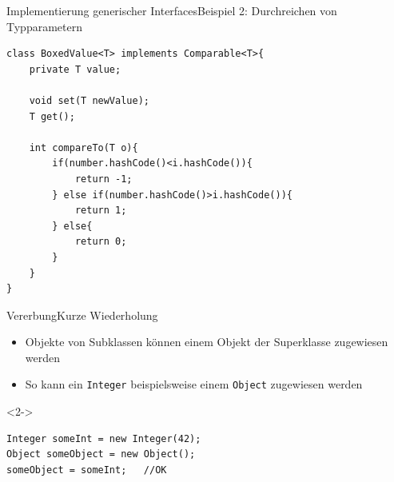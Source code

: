 \begin{frame}[fragile]{Implementierung generischer Interfaces}{Beispiel 2: Durchreichen von Typparametern}
\lstset{style=java}
\begin{lstlisting}
class BoxedValue<T> implements Comparable<T>{
    private T value;
    
    void set(T newValue);
    T get();
    
    int compareTo(T o){
        if(number.hashCode()<i.hashCode()){
            return -1;
        } else if(number.hashCode()>i.hashCode()){
            return 1;
        } else{
            return 0;
        }
    }
}
\end{lstlisting}
\end{frame}


\begin{frame}[fragile]{Vererbung}{Kurze Wiederholung}
\begin{minipage}{0.6\textwidth}
    \begin{itemize}
        \item Objekte von Subklassen können einem Objekt der Superklasse zugewiesen werden 
        \item So kann ein \texttt{Integer} beispielsweise einem \texttt{Object} zugewiesen werden
    \end{itemize}
    \lstset{style=java}
    \begin{onlyenv}<2->
    \begin{lstlisting}
Integer someInt = new Integer(42);
Object someObject = new Object();
someObject = someInt;   //OK
    \end{lstlisting}
    \end{onlyenv}
\end{minipage}%
\begin{minipage}{0.35\textwidth}
\centering
    \begin{figure}
        \centering
    \end{figure}
\end{minipage}
\end{frame}

